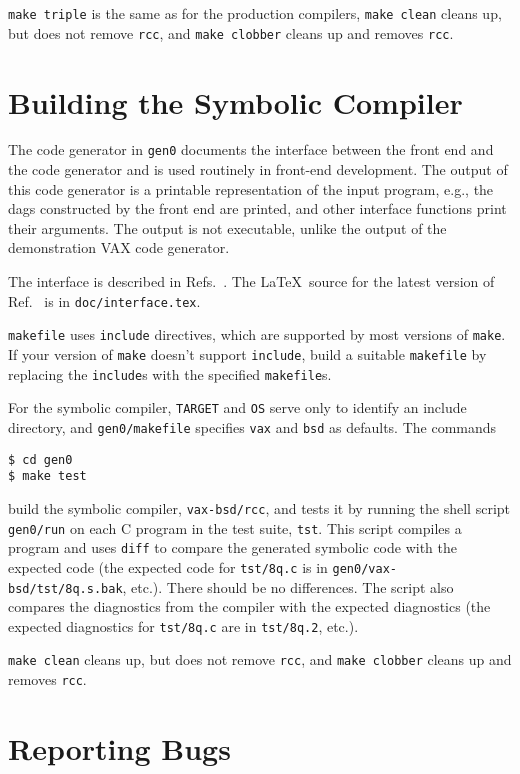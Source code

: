\verb|make triple| is the same as for the production compilers,
\verb|make clean| cleans up, but does not remove \verb|rcc|, and
\verb|make clobber| cleans up and removes \verb|rcc|.

\section{Building the Symbolic Compiler}\label{gen0}

The code generator in \verb|gen0| documents the
interface between the front end and the code generator and is used routinely in
front-end development. The output of this code generator is a printable
representation of the input program, e.g., the dags constructed by the
front end are printed, and other interface functions print their arguments.
The output is not executable, unlike the output of the demonstration
VAX code generator.

The interface is described in
Refs.~\cite{fraser:hanson:interface:TR,fraser:hanson:91a}.
The \LaTeX\ source for the latest version of
Ref.~\cite{fraser:hanson:interface:TR} is in \verb|doc/interface.tex|.

\verb|makefile| uses \verb|include| directives, which are supported by
most versions of \verb|make|. If your version of \verb|make|
doesn't support \verb|include|, build a suitable \verb|makefile|
by replacing the \verb|include|s with the specified \verb|makefile|s.

For the symbolic compiler, \verb|TARGET| and \verb|OS| serve only
to identify an include directory, and \verb|gen0/makefile|
specifies \verb|vax| and \verb|bsd| as defaults.
The commands
\begin{verbatim}
$ cd gen0
$ make test
\end{verbatim}
build the symbolic compiler, \verb|vax-bsd/rcc|, and tests it by running the shell script
\verb|gen0/run| on each C program in the test suite, \verb|tst|.
This script compiles a program and uses \verb|diff| to compare the generated symbolic code
with the expected code (the expected code for \verb|tst/8q.c| is
in \verb|gen0/vax-bsd/tst/8q.s.bak|, etc.). There should be no differences.
The script also compares the
diagnostics from the compiler with the expected diagnostics
(the expected diagnostics for \verb|tst/8q.c| are
in \verb|tst/8q.2|, etc.).

\verb|make clean| cleans up, but does not remove \verb|rcc|, and
\verb|make clobber| cleans up and removes \verb|rcc|.

\section{Reporting Bugs}\label{bugs}

